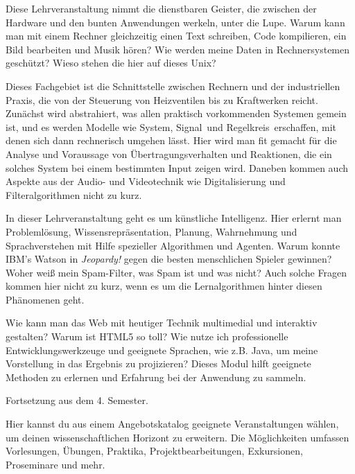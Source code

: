 \newpage


Diese Lehrveranstaltung nimmt die dienstbaren Geister, die zwischen der Hardware und den bunten Anwendungen werkeln, unter die Lupe.
Warum kann man mit einem Rechner gleichzeitig einen Text schreiben, Code kompilieren, ein Bild bearbeiten und Musik hören?
Wie werden meine Daten in Rechnersystemen geschützt?
Wieso stehen die hier auf dieses Unix?

Dieses Fachgebiet ist die Schnittstelle zwischen Rechnern und der industriellen Praxis, die von der Steuerung von Heizventilen bis zu Kraftwerken reicht.
Zunächst wird abstrahiert, was allen praktisch vorkommenden Systemen gemein ist, und es werden Modelle wie \glqq System\grqq, \glqq Signal\grqq\ und \glqq Regelkreis\grqq\ erschaffen, mit denen sich dann rechnerisch umgehen lässt.
Hier wird man fit gemacht für die Analyse und Voraussage von Übertragungsverhalten und Reaktionen, die ein solches System bei einem bestimmten Input zeigen wird.
Daneben kommen auch Aspekte aus der Audio- und Videotechnik wie Digitalisierung und Filteralgorithmen nicht zu kurz.

In dieser Lehrveranstaltung geht es um künstliche Intelligenz.
Hier erlernt man Problemlösung, Wissensrepräsentation, Planung, Wahrnehmung und Sprachverstehen mit Hilfe spezieller Algorithmen und Agenten.
Warum konnte IBM's Watson in \textit{Jeopardy!} gegen die besten menschlichen Spieler gewinnen? Woher weiß mein Spam-Filter, was Spam ist und was nicht?
Auch solche Fragen kommen hier nicht zu kurz, wenn es um die Lernalgorithmen hinter diesen Phänomenen geht.

Wie kann man das Web mit heutiger Technik multimedial und interaktiv gestalten? Warum ist HTML5 so toll?
Wie nutze ich professionelle Entwicklungswerkzeuge und geeignete Sprachen, wie z.B. Java, um meine Vorstellung in das Ergebnis zu projizieren?
Dieses Modul hilft geeignete Methoden zu erlernen und Erfahrung bei der Anwendung zu sammeln.

Fortsetzung aus dem 4. Semester.

\newpage

Hier kannst du aus einem Angebotskatalog geeignete Veranstaltungen wählen, um deinen wissenschaftlichen Horizont zu erweitern.
Die Möglichkeiten umfassen Vorlesungen, Übungen, Praktika, Projektbearbeitungen, Exkursionen, Proseminare und mehr.

